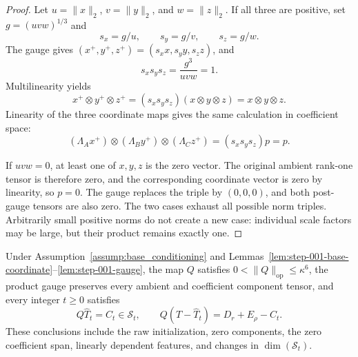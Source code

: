 \begin{proof}
Let $u=\|x\|_2$, $v=\|y\|_2$, and $w=\|z\|_2$.  If all three are
positive, set $g=(uvw)^{1/3}$ and
\[
s_x=g/u,
\qquad s_y=g/v,
\qquad s_z=g/w.
\]
The gauge gives $(x^+,y^+,z^+)=(s_xx,s_yy,s_zz)$, and
\[
s_xs_ys_z=\frac{g^3}{uvw}=1.
\]
Multilinearity yields
\[
x^+\otimes y^+\otimes z^+
=(s_xs_ys_z)(x\otimes y\otimes z)=x\otimes y\otimes z.
\]
Linearity of the three coordinate maps gives the same calculation in
coefficient space:
\[
(\Lambda_Ax^+)\otimes(\Lambda_By^+)\otimes(\Lambda_Cz^+)
=(s_xs_ys_z)p=p.
\]

If $uvw=0$, at least one of $x,y,z$ is the zero vector.  The original
ambient rank-one tensor is therefore zero, and the corresponding coordinate
vector is zero by linearity, so $p=0$.  The gauge replaces the triple by
$(0,0,0)$, and both post-gauge tensors are also zero.  The two cases exhaust
all possible norm triples.  Arbitrarily small positive norms do not create a
new case: individual scale factors may be large, but their product remains
exactly one.
\end{proof}

\begin{proposition}
\label{prop:step-001-same-target}
Under Assumption~\ref{assump:base_conditioning} and
Lemmas~\ref{lem:step-001-base-coordinate}--\ref{lem:step-001-gauge}, the
map $Q$ satisfies $0<\|Q\|_{\mathrm{op}}\leq\kappa^6$, the product gauge
preserves every ambient and coefficient component tensor, and every integer
$t\geq0$ satisfies
\[
Q\widehat T_t=C_t\in\mathcal S_t,
\qquad
Q(T-\widehat T_t)=D_r+E_\rho-C_t.
\]
These conclusions include the raw initialization, zero components, the zero
coefficient span, linearly dependent features, and changes in
$\dim(\mathcal S_t)$.
\end{proposition}


